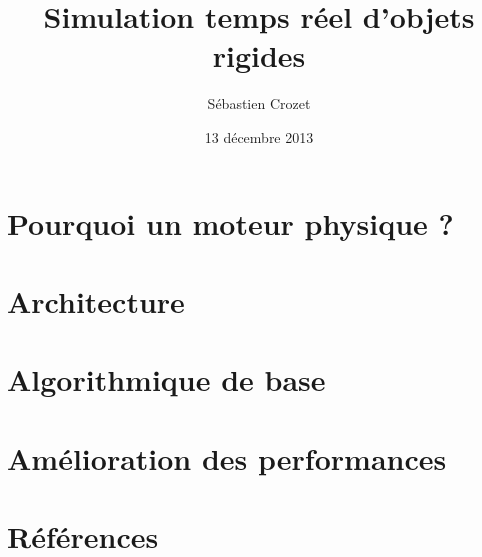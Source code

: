 \documentclass{beamer}
\date{13 décembre 2013}
\title{Simulation temps réel d'objets rigides}
\author{Sébastien Crozet}
\begin{document}
\maketitle

\section{Pourquoi un moteur physique ?}

\section{Architecture}

\section{Algorithmique de base}

\section{Amélioration des performances}

\section{Références}
\end{document}
